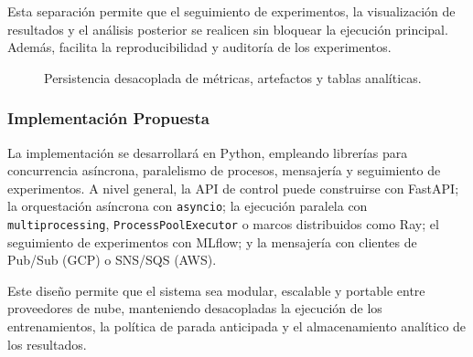 \documentclass[conference]{IEEEtran}
\begin{document}
Esta separación permite que el seguimiento de experimentos, la visualización de resultados y el análisis posterior se realicen sin bloquear la ejecución principal. Además, facilita la reproducibilidad y auditoría de los experimentos.

\begin{figure}[!t]
\centering
{}
\caption{Persistencia desacoplada de métricas, artefactos y tablas analíticas.}
\label{fig:fanout_metrics}
\end{figure}

\subsubsection{Implementación Propuesta}

La implementación se desarrollará en Python, empleando librerías para concurrencia asíncrona, paralelismo de procesos, mensajería y seguimiento de experimentos. A nivel general, la API de control puede construirse con FastAPI; la orquestación asíncrona con \texttt{asyncio}; la ejecución paralela con \texttt{multiprocessing}, \texttt{ProcessPoolExecutor} o marcos distribuidos como Ray; el seguimiento de experimentos con MLflow; y la mensajería con clientes de Pub/Sub (GCP) o SNS/SQS (AWS).

Este diseño permite que el sistema sea modular, escalable y portable entre proveedores de nube, manteniendo desacopladas la ejecución de los entrenamientos, la política de parada anticipada y el almacenamiento analítico de los resultados.
\end{document}
